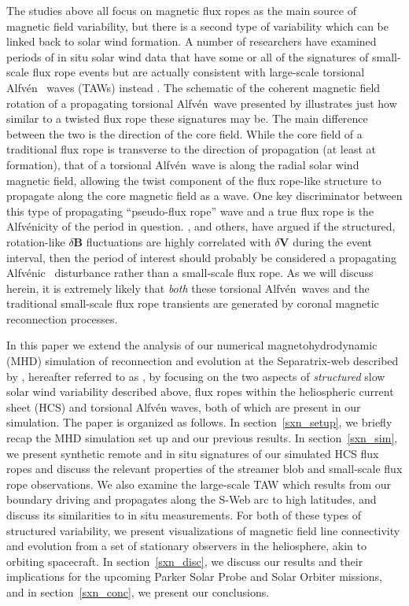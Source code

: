 \documentclass[preprint]{aastex62}
\newcommand{\Alfven}{Alfv\'{e}n\ }
\newcommand{\Alfvenic}{Alfv\'{e}nic\ }
\begin{document}
The studies above all focus on magnetic flux ropes as the main source 
of magnetic field variability, but 
there is a second type of variability which can be linked back to solar wind formation.
A number of researchers have examined periods of in situ solar wind
data that have some or all of the signatures of small-scale flux
rope events but are actually consistent with large-scale torsional \Alfven
waves (TAWs) instead \citep[e.g.][]{Gosling2010taw, Marubashi2010taw,
Cartwright2010, Yu2014}. The schematic of the coherent magnetic
field rotation of a propagating torsional \Alfven wave presented
by \citet{Marubashi2010taw} illustrates just how similar to a twisted
flux rope these signatures may be.
%
The main difference between the two is the direction of the core
field. While the core field of a traditional flux rope is transverse
to the direction of propagation (at least at formation), that of a
torsional \Alfven wave is along the radial solar wind magnetic
field, allowing the twist component of the flux rope-like structure
to propagate along the core magnetic field as a wave.
%
One key discriminator between this type of propagating ``pseudo-flux
rope'' wave and a true flux rope is the Alfv\'{e}nicity of the
period in question.
%
\citet{Yu2014}, and others, have argued if the structured, rotation-like
$\delta \boldsymbol{B}$ fluctuations are highly correlated with
$\delta \boldsymbol{V}$ during the event interval, then the period
of interest should probably be considered a propagating \Alfvenic
disturbance rather than a small-scale flux rope.
%
As we will discuss herein, it is extremely likely that \emph{both}
these torsional \Alfven waves and the traditional small-scale flux
rope transients are generated by coronal magnetic reconnection processes.

{In this paper we extend the analysis of our numerical magnetohydrodynamic 
(MHD) simulation of reconnection and evolution at the Separatrix-web \citep[S-web;][]{Antiochos2011} 
described by \citet{Higginson2017b}, hereafter referred to as ,
by focusing on the two aspects of \emph{structured} slow solar wind variability described
above, flux ropes within the heliospheric current sheet (HCS) and torsional Alfv\'{e}n waves, both of which are present in our simulation.}
%
The paper is organized as follows. 
%
In section~\ref{sxn_setup}, we briefly recap the
 MHD simulation set up and our previous
results.
%
In section~\ref{sxn_sim}, {we present synthetic remote and in situ signatures 
of our simulated HCS flux ropes and discuss the relevant properties of the 
streamer blob and small-scale flux rope observations.}
%
We also examine the large-scale TAW which results from our boundary
driving and propagates along the S-Web arc to high latitudes, and
discuss its similarities to in situ measurements.
%
For both of these types of structured variability, we present visualizations
of magnetic field line connectivity and evolution from a set of
stationary observers in the heliosphere, akin to orbiting spacecraft.
%
In section~\ref{sxn_disc}, we discuss our results and their
implications for the upcoming Parker Solar Probe and Solar Orbiter
missions, and in section~\ref{sxn_conc}, we present our conclusions.
\end{document}
